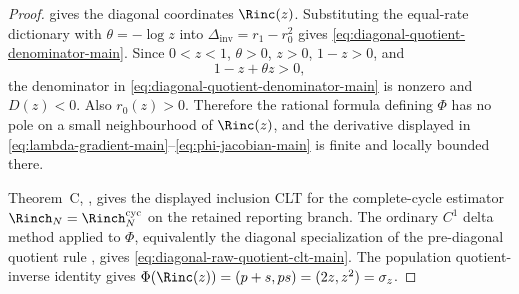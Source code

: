 \begin{proof}
 gives the diagonal coordinates
\(\Rinc(z)\).  Substituting the equal-rate dictionary with
\(\theta=-\log z\) into \(\Delta_{\mathrm{inv}}=r_1-r_0^2\) gives
\eqref{eq:diagonal-quotient-denominator-main}.  Since \(0<z<1\),
\(\theta>0\), \(z>0\), \(1-z>0\), and
\[
1-z+\theta z>0,
\]
the denominator in \eqref{eq:diagonal-quotient-denominator-main} is nonzero
and \(D(z)<0\).  Also \(r_0(z)>0\).  Therefore the rational formula defining
\(\Phi\) has no pole on a small neighbourhood of \(\Rinc(z)\), and the derivative
displayed in \eqref{eq:lambda-gradient-main}--\eqref{eq:phi-jacobian-main} is
finite and locally bounded there.

Theorem~C,
, gives the displayed inclusion
CLT for the complete-cycle estimator \(\Rinch_N=\Rinch_N^{\mathrm{cyc}}\)
on the retained reporting branch.  The ordinary \(C^1\) delta method applied
to \(\Phi\), equivalently the diagonal specialization of the pre-diagonal
quotient rule , gives
\eqref{eq:diagonal-raw-quotient-clt-main}.  The population quotient-inverse
identity gives \(\Phi(\Rinc(z))=(p+s,ps)=(2z,z^2)=\sigma_z\).


\end{proof}
